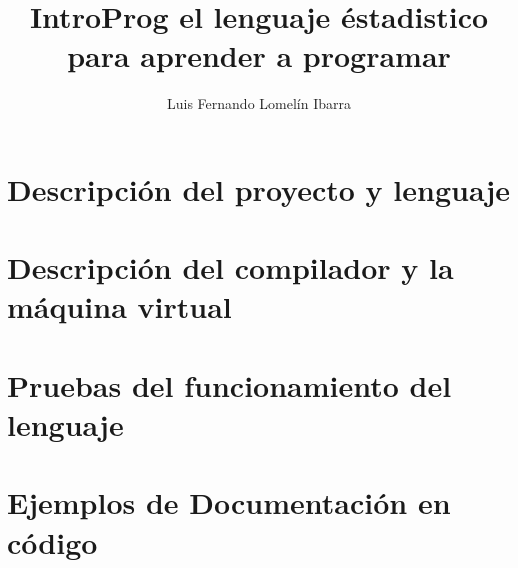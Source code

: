 \documentclass[krantz1,ChapterTOCs, spanish]{krantz}
\begin{document}
\frontmatter

\title{IntroProg el lenguaje éstadistico para aprender a programar 
}
\author{Luis Fernando Lomelín Ibarra}

\maketitle


\cleardoublepage
\setcounter{page}{7} %
\tableofcontents
%
%
%
%

\mainmatter

\part{Descripción del proyecto y lenguaje}



%

\part{Descripción del compilador y la máquina virtual}




\part{Pruebas del funcionamiento del lenguaje}


\part{Ejemplos de Documentación en código}
\end{document}
